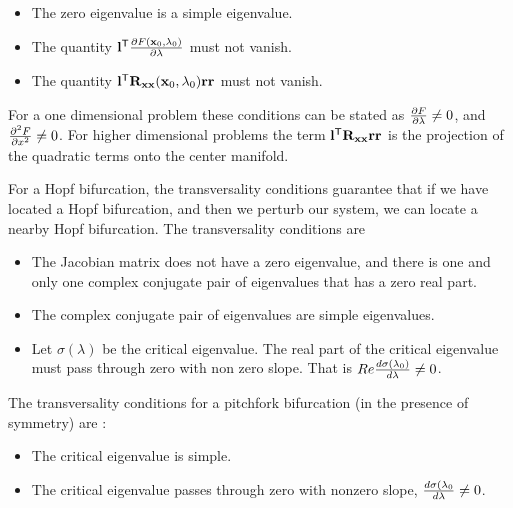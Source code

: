 \begin{itemize}
\item  The zero eigenvalue is a simple eigenvalue.
\item  The quantity ${\bf l}^{\mathsf{T}} \frac{\partial F({\bf x}_0,\lambda_0)}{\partial \lambda}$
must not vanish.
\item The quantity ${\bf l}^{\mathsf{T}} {\bf R}_{{\bf x} {\bf x}}({\bf x}_0,\lambda_0) 
{\bf r} {\bf r} $ must not vanish.
\end{itemize}

For a one dimensional problem these conditions can be 
stated as $\frac{\partial F}{\partial \lambda} \neq 0 $, and $\frac{\partial ^2F}{\partial x^2} \neq0$.
For higher dimensional problems the  term ${\bf l}^{\mathsf{T}} {\bf R}_{{\bf x} {\bf x}}
{\bf r} {\bf r} $ is the projection of the quadratic terms onto the
center manifold.  

 For a Hopf bifurcation, the transversality conditions 
guarantee that if we have located a Hopf bifurcation, and then
we perturb our system, we can locate a nearby Hopf bifurcation.
The transversality conditions are

\begin{itemize}
\item   The Jacobian matrix does not have a zero eigenvalue, 
and there is one and only one complex conjugate pair of 
eigenvalues that has a zero real part.
\item  The complex conjugate pair of eigenvalues are simple 
eigenvalues.
\item  Let $\sigma(\lambda)$ be the critical eigenvalue.
The real part of the critical eigenvalue must pass through 
zero with non zero slope.  That is 
$ Re \frac{d \sigma(\lambda_0)}{d \lambda} \neq 0 $. 
\end{itemize}

The transversality conditions for a pitchfork bifurcation
(in the presence of symmetry) are :

\begin{itemize}
\item The critical eigenvalue is simple.
\item The critical eigenvalue passes through zero with 
nonzero slope, $\frac{d \sigma(\lambda_0}{d \lambda} \neq 0 $.
\end{itemize}

